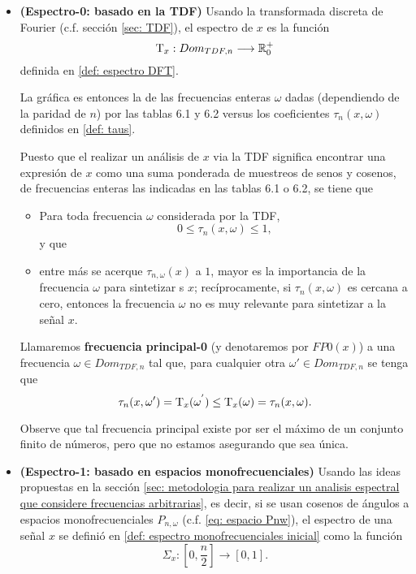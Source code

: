 \begin{itemize}
	\item \textbf{(Espectro-0: basado en la TDF)} 
	Usando la transformada discreta de Fourier
	(c.f. sección \ref{sec: TDF}),
	el espectro de $x$ es la función
	\[
	\mathrm{T}_{x}: Dom_{TDF, n} \longrightarrow \mathbb{R}^{+}_{0}
	\]	
	definida en \ref{def: espectro DFT}.
	
	La gráfica es entonces la de las frecuencias
	enteras $\omega$ dadas (dependiendo de la 
	paridad de $n$) por las
	tablas 6.1 y 6.2
	versus los coeficientes
	$\tau_{n}(x, \omega)$ definidos en
	\ref{def: taus}.
	
	Puesto que el realizar un análisis de 
	$x$ via la TDF significa encontrar una
	expresión de $x$ como una suma
	ponderada de muestreos de senos y cosenos,
	de frecuencias enteras las indicadas en las tablas 6.1 o 6.2,
	se tiene que  
	\begin{itemize}
		\item Para toda frecuencia $\omega$ considerada
		por la TDF,
		\[
		0 \leq \tau_{n}(x, \omega) \leq 1,
		\]
		y que
		\item entre más se acerque
		$\tau_{n, \omega}(x)$
		a $1$, mayor es la
		importancia de la frecuencia $\omega$ para
		sintetizar s $x$; recíprocamente, si 
		$\tau_{n}(x, \omega)$ es cercana a cero, entonces
		la frecuencia $\omega$ no es muy relevante para 
		sintetizar a la señal $x$.
	\end{itemize}
	\begin{defi}
	\label{def: FM0}
	Llamaremos \textbf{frecuencia principal-0}
	(y denotaremos por $FP0(x)$) 
	a una 
	frecuencia $\omega \in Dom_{TDF, n}$
	tal que, para cualquier otra $\omega' \in Dom_{TDF, n}$ 
	se tenga que 
	\[
	\tau_{n}(x, \omega') = \mathrm{T}_{x}(\omega^{'}) \leq
	\mathrm{T}_{x}(\omega) =  
	 \tau_{n}(x, \omega).
	\]
	\end{defi}
	Observe que tal frecuencia principal existe por ser 
	el máximo de un conjunto finito de números, pero que no 
	estamos asegurando que sea única. 
	
	\item \textbf{(Espectro-1: basado en espacios monofrecuenciales)} 
	Usando
	las ideas propuestas en 
	la sección
	\ref{sec: metodologia para realizar un analisis espectral que considere frecuencias arbitrarias}, 
	es decir, si se usan cosenos de ángulos a
	espacios monofrecuenciales $P_{n, \omega}$
	(c.f. \ref{eq: espacio Pnw}), el espectro
	de una señal $x$ se definió en
	\ref{def: espectro monofrecuenciales inicial}
	como la función 
	\[
	\Sigma_{x} : \left[0, \frac{n}{2} \right] \longrightarrow [0,1].
	\]
	

\end{itemize}
